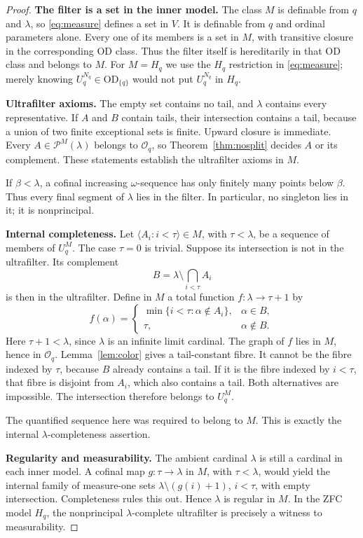 \documentclass[11pt,letterpaper]{article}
\theoremstyle{definition}
\numberwithin{equation}{section}
\newcommand{\OD}{\mathrm{OD}}
\newcommand{\powM}[2]{\mathcal P^{#1}(#2)}
\begin{document}
\begin{proof}
\textbf{The filter is a set in the inner model.}
The class $M$ is definable from $q$ and $\lambda$, so \eqref{eq:measure} defines a set in $V$. It is definable from $q$ and ordinal parameters alone. Every one of its members is a set in $M$, with transitive closure in the corresponding OD class. Thus the filter itself is hereditarily in that OD class and belongs to $M$. For $M=H_q$ we use the $H_q$ restriction in \eqref{eq:measure}; merely knowing $U_q^{N_q}\in\OD_{\{q\}}$ would not put $U_q^{N_q}$ in $H_q$.

\textbf{Ultrafilter axioms.}
The empty set contains no tail, and $\lambda$ contains every representative. If $A$ and $B$ contain tails, their intersection contains a tail, because a union of two finite exceptional sets is finite. Upward closure is immediate. Every $A\in\powM{M}{\lambda}$ belongs to $\mathcal O_q$, so Theorem~\ref{thm:nosplit} decides $A$ or its complement. These statements establish the ultrafilter axioms in $M$.

If $\beta<\lambda$, a cofinal increasing $\omega$-sequence has only finitely many points below $\beta$. Thus every final segment of $\lambda$ lies in the filter. In particular, no singleton lies in it; it is nonprincipal.

\textbf{Internal completeness.}
Let $\langle A_i:i<\tau\rangle\in M$, with $\tau<\lambda$, be a sequence of members of $U_q^M$. The case $\tau=0$ is trivial. Suppose its intersection is not in the ultrafilter. Its complement
\[
 B=\lambda\setminus\bigcap_{i<\tau}A_i
\]
is then in the ultrafilter. Define in $M$ a total function $f:\lambda\to\tau+1$ by
\[
 f(\alpha)=
 \begin{cases}
  \min\{i<\tau:\alpha\notin A_i\},&\alpha\in B,\\
  \tau,&\alpha\notin B.
 \end{cases}
\]
Here $\tau+1<\lambda$, since $\lambda$ is an infinite limit cardinal. The graph of $f$ lies in $M$, hence in $\mathcal O_q$. Lemma~\ref{lem:color} gives a tail-constant fibre. It cannot be the fibre indexed by $\tau$, because $B$ already contains a tail. If it is the fibre indexed by $i<\tau$, that fibre is disjoint from $A_i$, which also contains a tail. Both alternatives are impossible. The intersection therefore belongs to $U_q^M$.

The quantified sequence here was required to belong to $M$. This is exactly the internal $\lambda$-completeness assertion.

\textbf{Regularity and measurability.}
The ambient cardinal $\lambda$ is still a cardinal in each inner model. A cofinal map $g:\tau\to\lambda$ in $M$, with $\tau<\lambda$, would yield the internal family of measure-one sets $\lambda\setminus(g(i)+1)$, $i<\tau$, with empty intersection. Completeness rules this out. Hence $\lambda$ is regular in $M$. In the ZFC model $H_q$, the nonprincipal $\lambda$-complete ultrafilter is precisely a witness to measurability.
\end{proof}
\end{document}
